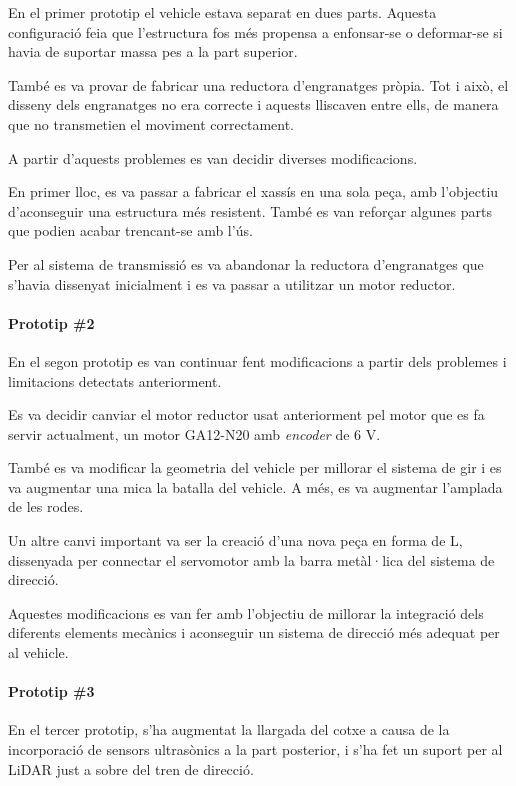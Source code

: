 \documentclass[11pt,a4paper]{article}
\begin{document}
En el primer prototip el vehicle estava separat en dues parts. Aquesta configuració feia que l'estructura fos més propensa a enfonsar-se o deformar-se si havia de suportar massa pes a la part superior.

També es va provar de fabricar una reductora d'engranatges pròpia. Tot i això, el disseny dels engranatges no era correcte i aquests lliscaven entre ells, de manera que no transmetien el moviment correctament.

A partir d'aquests problemes es van decidir diverses modificacions.

En primer lloc, es va passar a fabricar el xassís en una sola peça, amb l'objectiu d'aconseguir una estructura més resistent. També es van reforçar algunes parts que podien acabar trencant-se amb l'ús.

Per al sistema de transmissió es va abandonar la reductora d'engranatges que s'havia dissenyat inicialment i es va passar a utilitzar un motor reductor.

\paragraph*{Prototip \#2}

En el segon prototip es van continuar fent modificacions a partir dels problemes i limitacions detectats anteriorment.

Es va decidir canviar el motor reductor usat anteriorment pel motor que es fa servir actualment, un motor GA12-N20 amb \emph{encoder} de 6 V.

També es va modificar la geometria del vehicle per millorar el sistema de gir i es va augmentar una mica la batalla del vehicle. A més, es va augmentar l'amplada de les rodes.

Un altre canvi important va ser la creació d'una nova peça en forma de L, dissenyada per connectar el servomotor amb la barra metàl·lica del sistema de direcció.

Aquestes modificacions es van fer amb l'objectiu de millorar la integració dels diferents elements mecànics i aconseguir un sistema de direcció més adequat per al vehicle.

\paragraph*{Prototip \#3}

En el tercer prototip, s’ha augmentat la llargada del cotxe a causa de la incorporació de sensors ultrasònics a la part posterior, i s’ha fet un suport per al LiDAR just a sobre del tren de direcció.
\end{document}
